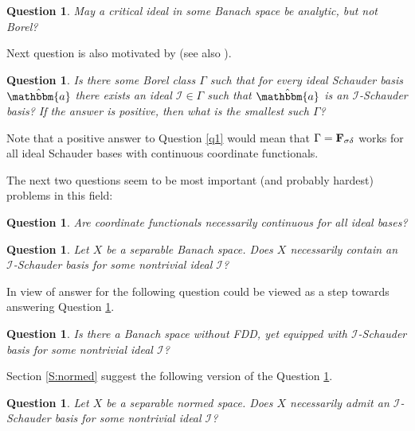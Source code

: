 \documentclass{amsart}
\newcommand{\I}{\mathcal{I}}
\newcommand{\w}{\mathbbm}
\newtheorem{question}[theorem]{Question}
\begin{document}
\begin{question}
May a critical ideal in some Banach space be analytic, but not Borel?
\end{question}

Next question is also motivated by \cite[Theorem 1.18]{ARTT} (see also \cite[Question 2]{RKS}).

\begin{question}
Is there some Borel class $\Gamma$ such that for every ideal Schauder basis $\hat{\w{a}}$ there exists an ideal $\I\in\Gamma$ such that $\hat{\w{a}}$ is an $\I$-Schauder basis? If the answer is positive, then what is the smallest such $\Gamma$?
\end{question}

Note that a positive answer to Question \ref{q1} would mean that $\Gamma=\bf{F_{\sigma\delta}}$ works for all ideal Schauder bases with continuous coordinate functionals.



The next two questions seem to be most important (and probably hardest) problems in this field:

\begin{question}\cite[Question 1]{RKS}
Are coordinate functionals necessarily continuous for all ideal bases?     
\end{question}

\begin{question}\label{Q:allspaces}
Let $X$ be a separable Banach space. Does $X$ necessarily contain an $\I$-Schauder basis for some nontrivial ideal $\I$?
\end{question}

In view of \cite[Example 1.14]{ARTT} answer for the following question could be viewed as a step towards answering Question \ref{Q:allspaces}.

\begin{question}
Is there a Banach space without FDD, yet equipped with $\I$-Schauder basis for some nontrivial ideal $\I$?
\end{question}

Section \ref{S:normed} suggest the following version of the Question \ref{Q:allspaces}.

\begin{question}
Let $X$ be a separable normed space. Does $X$ necessarily admit an $\I$-Schauder basis for some nontrivial ideal $\I$?
\end{question}
\end{document}
